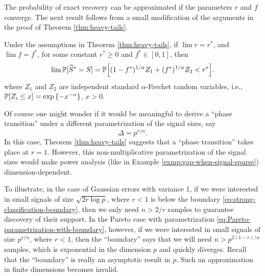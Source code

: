 The probability of exact recovery can be approximated if the parameters $r$ and $f$ converge.
The next result follows from a small modification of the arguments in the proof of Theorem \ref{thm:heavy-tails}.

\begin{corollary}
Under the assumptions in Theorem \ref{thm:heavy-tails}, if 
$\lim r = r^*$, and $\lim f = f^*$, for some constant $r^*\ge0$ and $f^*\in[0,1]$, then 
$$
    \lim \P[\widehat{S}^*=S] 
    = \P\Big[(1-f^*)^{1/\alpha}Z_1 + (f^*)^{1/\alpha}Z_2 < {r^*}\Big].
$$
where $Z_1$ and $Z_2$ are independent standard $\alpha$-Frechet random variables, i.e., $\P[Z_i \le x] = \exp{\{-x^{-\alpha}\}}$, $x>0$.
\end{corollary}

\begin{remark}
Of course one might wonder if it would be meaningful to derive a ``phase transition'' under a different parametrization of the signal sizes, say 
\begin{equation} \label{eq:Pareto-parametrization-with-boundary}
    \Delta = p^{r/\alpha}.
\end{equation}
In this case, Theorem \ref{thm:heavy-tails} suggests that a ``phase transition'' takes place at $r=1$.
However, this non-multiplicative parametrization of the signal sizes would make power analysis (like in Example \ref{exmp:gap-when-signal-sparse}) dimension-dependent. 

To illustrate, in the case of Gaussian errors with variance 1, if we were interested in small signals of size $\sqrt{2r\log{p}}$, where $r<1$ is below the boundary \eqref{eq:strong-classification-boundary}, then we only need $n > 2/r$ samples to guarantee discovery of their support.
In the Pareto case with parametrization \eqref{eq:Pareto-parametrization-with-boundary}, however, if we were interested in small signals of size $p^{r/\alpha}$, where $r<1$, then the ``boundary'' says that we will need $n > p^{2(1-r)/\alpha}$ samples, which is exponential in the dimension $p$ and quickly diverges.
Recall that the ``boundary'' is really an asymptotic result in $p$. 
Such an approximation in finite dimensions becomes invalid.
\end{remark}

